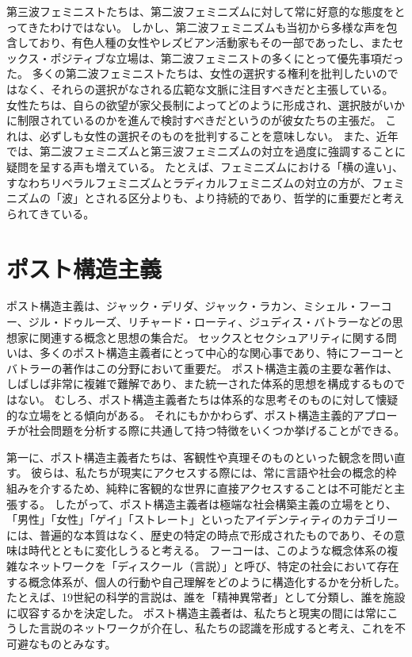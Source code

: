 \documentclass[paper=a4,book,openany]{jlreq}
\begin{document}
第三波フェミニストたちは、第二波フェミニズムに対して常に好意的な態度をとってきたわけではない。
しかし、第二波フェミニズムも当初から多様な声を包含しており、有色人種の女性やレズビアン活動家もその一部であったし、またセックス・ポジティブな立場は、第二波フェミニストの多くにとって優先事項だった。
多くの第二波フェミニストたちは、女性の選択する権利を批判したいのではなく、それらの選択がなされる広範な文脈に注目すべきだと主張している。
女性たちは、自らの欲望が家父長制によってどのように形成され、選択肢がいかに制限されているのかを進んで検討すべきだというのが彼女たちの主張だ。
これは、必ずしも女性の選択そのものを批判することを意味しない。
また、近年では、第二波フェミニズムと第三波フェミニズムの対立を過度に強調することに疑問を呈する声も増えている。
たとえば、フェミニズムにおける「横の違い」、すなわちリベラルフェミニズムとラディカルフェミニズムの対立の方が、フェミニズムの「波」とされる区分よりも、より持続的であり、哲学的に重要だと考えられてきている。

\section{ポスト構造主義}

ポスト構造主義は、ジャック・デリダ、ジャック・ラカン、ミシェル・フーコー、ジル・ドゥルーズ、リチャード・ローティ、ジュディス・バトラーなどの思想家に関連する概念と思想の集合だ。
セックスとセクシュアリティに関する問いは、多くのポスト構造主義者にとって中心的な関心事であり、特にフーコーとバトラーの著作はこの分野において重要だ。
ポスト構造主義の主要な著作は、しばしば非常に複雑で難解であり、また統一された体系的思想を構成するものではない。
むしろ、ポスト構造主義者たちは体系的な思考そのものに対して懐疑的な立場をとる傾向がある。
それにもかかわらず、ポスト構造主義的アプローチが社会問題を分析する際に共通して持つ特徴をいくつか挙げることができる。

第一に、ポスト構造主義者たちは、客観性や真理そのものといった観念を問い直す。
彼らは、私たちが現実にアクセスする際には、常に言語や社会の概念的枠組みを介するため、純粋に客観的な世界に直接アクセスすることは不可能だと主張する。
したがって、ポスト構造主義者は極端な社会構築主義の立場をとり、「男性」「女性」「ゲイ」「ストレート」といったアイデンティティのカテゴリーには、普遍的な本質はなく、歴史の特定の時点で形成されたものであり、その意味は時代とともに変化しうると考える。
フーコーは、このような概念体系の複雑なネットワークを「ディスクール（言説）」と呼び、特定の社会において存在する概念体系が、個人の行動や自己理解をどのように構造化するかを分析した。
たとえば、19世紀の科学的言説は、誰を「精神異常者」として分類し、誰を施設に収容するかを決定した。
ポスト構造主義者は、私たちと現実の間には常にこうした言説のネットワークが介在し、私たちの認識を形成すると考え、これを不可避なものとみなす。
\end{document}
